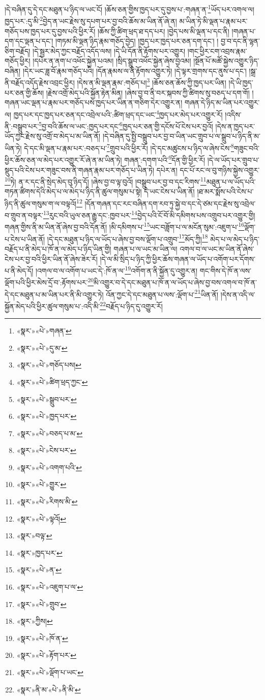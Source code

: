 །དེ་བཞིན་དུ་དེ་དང་མཐུན་པ་ཉིད་ལ་ཡང་ངོ། །ཆོས་ཅན་གྱིས་ཁྱད་པར་དུ་བྱས་པ་:གཞན་ན་\footnote{«སྣར་»«པེ་»གཞན་}ཡོད་པར་འགལ་ལ། ཁྱད་པར་:དུ་མི་\footnote{«སྣར་»«པེ་»དུ་མ་}བྱེད་ན་ཡང་རྗེས་སུ་དཔག་པར་བྱ་བའི་ཆོས་མ་ཡིན་ནོ་ཞེ་ན། མ་ཡིན་ཏེ་མི་ལྡན་པ་རྣམ་པར་གཅོད་པས་ཁྱད་པར་དུ་བྱས་པའི་ཕྱིར་རོ། །ཆོས་ཀྱི་ཚིག་ཕྲད་ཐ་དད་པར། །བྱེད་པས་མི་ལྡན་པ་དང་ནི། །གཞན་པ་དག་དང་ལྡན་པ་དང་། །གཏམ་མི་ལྡན་ཉིད་རྣམ་གཅོད་བྱེད། །ཁྱད་པར་ཁྱད་པར་ཅན་དག་དང་། །
བྱ་བ་དང་ནི་ལྷན་ཅིག་བརྗོད། །དེ་སྦྱར་མེད་ཀྱང་བརྗོད་འདོད་ལས། །དེ་ཡི་དོན་ནི་རྟོགས་པར་འགྱུར། །གང་ཕྱིར་ངག་འབྲས་རྣམ་གཅོད་ཕྱིར། །དཔེར་ན་ནག་པ་འཕོང་སྐྱེན་པའམ། །སྲིད་སྒྲུབ་འཕོང་སྐྱེན་ཞེས་བྱའམ། །སྔོན་པོ་མཚོ་སྐྱེས་འགྱུར་ཉིད་བཞིན། །དེར་ཡང་ཟླ་བོ་རྣམ་གཅོད་པའི། །དོན་རྣམས་ལ་ནི་རྟོགས་འགྱུར་ཏེ། །དེ་ལྟར་གྲགས་དང་ནུས་པ་དང་། །སྒྲ་ནི་བརྗོད་འདོད་རྗེས་འབྲང་ཕྱིར། །དེས་ན་མི་ལྡན་རྣམ་:གཅོད་པ།\footnote{«སྣར་»«པེ་»གཅོད་པས།} །ཆོས་ཅན་ཆོས་ཀྱི་ཁྱད་པར་ཡིན། །དེ་ཡི་ཁྱད་པར་ཅན་གྱི་ཆོས། །རྗེས་འགྲོ་མེད་པའི་སྐྱོན་རྟེན་མིན། །ཞེས་བྱ་བ་ནི་བར་སྐབས་ཀྱི་ཚིགས་སུ་བཅད་པ་དག་གོ། །གཞན་ཡང་ལྡན་པ་རྣམ་པར་གཅོད་པས་ཁྱད་པར་ཡིན་ན་གཅིག་དེར་འགྱུར་ན། གཞན་དེ་ཉིད་མ་ཡིན་པར་འགྱུར་ལ། ཁྱད་པར་དང་ཁྱད་པར་ཅན་དང་འབྲེལ་པའི་:ཚིག་ཕྲད་དང་ཡང་\footnote{«སྣར་»«པེ་»ཚིག་ཕྲད་ཀྱང་}ཁྱད་པར་མེད་པར་འགྱུར་རོ། །འདིས་ནི་:བསྒྲུབ་པར་\footnote{«སྣར་»«པེ་»སྒྲུབ་པར་}བྱ་བའི་ཆོས་ལ་ཡང་:ཁྱད་པར་དང་\footnote{«སྣར་»«པེ་»ཁྱད་པར་}ཁྱད་པར་ཅན་གྱི་དངོས་པོ་ངེས་པར་བྱའོ། །དེས་ན་ཁྱད་པར་ཡོད་ཀྱང་རྗེས་སུ་འགྲོ་བ་མེད་པ་མ་ཡིན་ནོ། །དེ་བཞིན་དུ་སྤྱི་བསྒྲུབ་པར་བྱ་བ་ཡིན་ཡང་གྲུབ་པ་ལ་སྒྲུབ་པ་ཉིད་ནི་མ་ཡིན་ཏེ། དེ་དང་མི་ལྡན་པ་རྣམ་པར་:བཅད་པ་\footnote{«སྣར་»«པེ་»བཅད་པ་མ་}གྲུབ་པའི་ཕྱིར་རོ། །དེ་དང་མཚུངས་པ་ཉིད་ལ་ཞེས་ངེས་\footnote{«སྣར་»«པེ་»ངེས་པར་}གཟུང་བའི་ཕྱིར་ཆོས་ཅན་ལ་མེད་པར་འགྱུར་རོ་ཞེ་ན་མ་ཡིན་ཏེ། གཞན་:དགག་པའི་\footnote{«སྣར་»«པེ་»འགག་པའི་}དོན་གྱི་ཕྱིར་རོ། །དེ་ལ་ཡོད་པར་གྲུབ་པ་སྡུད་པའི་ངེས་པར་གཟུང་བས་ནི་གཞན་རྣམ་པར་གཅོད་པ་ཡིན་ཏེ། དཔེར་ན། དང་པོ་རང་ལ་བུ་གཉིས་སྐྱེས་འགྱུར་\footnote{«སྣར་»«པེ་»གྱུར་}ཏེ། ན་ར་དང་ནི་སྲེད་མེད་བུ་ཉིད་དོ། །ཞེས་བྱ་བ་ལྟ་བུའོ། །བསྒྲུབ་པར་བྱ་བ་དང་རིགས་\footnote{«སྣར་»«པེ་»རིགས་མི་}མཐུན་པ་ལ་ཡོད་པའི་གཏན་ཚིགས་དེའི་མེད་པ་ལ་མེད་པ་ཉིད་ནི་ཚུལ་གསུམ་པ་སྟེ། དེ་ཡང་ངེས་པ་ཡིན་ནོ། །ཐ་མར་སྨོས་པའི་ངེས་པ་ཉིད་ནི་ཚུལ་གསུམ་ག་ལ་བལྟའོ།\footnote{«སྣར་»«པེ་»ལྟའོ།} །དོན་གཞན་དང་རང་བཞིན་དག་རབ་ཏུ་སྐྱེ་བ་དང་དེ་ཙམ་དང་རྗེས་སུ་འབྲེལ་བ་གྲུབ་ན་བལྟར་\footnote{«སྣར་»བལྟ་}རུང་བའི་ཡུལ་ཅན་རྒྱུ་དང་:ཁྱབ་པར་\footnote{«སྣར་»ཁྱད་པར་}བྱེད་པའི་ངོ་བོ་མི་དམིགས་པས་འགྲུབ་པར་འགྱུར་གྱི། གཞན་གྱིས་ནི་མ་ཡིན་ནོ་ཞེས་བྱ་བའི་དོན་ནོ། །མི་དམིགས་པ་\footnote{«སྣར་»«པེ་»ན་}ཡང་བཟློག་པ་ལ་མངོན་སུམ་:འཇུག་པ་\footnote{«སྣར་»«པེ་»འཇུག་པ་ལ་}ལྡོག་པ་ངེས་པ་ཡིན་ནོ། །དེ་དང་མཐུན་པ་ཉིད་ལ་ཡོད་པ་ཞེས་བྱ་བས་ལྡོག་པ་འགྲུབ་\footnote{«སྣར་»«པེ་»གྲུབ་}མོད་ཀྱི།\footnote{«སྣར་»ཀྱིས།} མེད་པ་ལ་མེད་པ་ཉིད་བརྗོད་པ་ནི་མེད་པ་ཁོ་ན་ལ་མེད་པ་ཉིད་ཡིན་གྱི། གཞན་པ་ལ་ཡང་མ་ཡིན་ལ། འགལ་བ་ལ་ཡང་མ་ཡིན་ནོ་ཞེས་ངེས་པར་བྱ་བའི་ཕྱིར་ཡིན་ནོ་ཞེས་ཟེར་རོ། །དེ་ལ་མི་སྲིད་པ་ཉིད་ཀྱི་ཕྱིར་ཆོས་གཞན་ལ་ཡོད་པ་འགོག་པར་དོགས་པ་ནི་མེད་དོ། །འགལ་བ་ལ་འགོག་པ་ཡང་དེ་:ཁོ་ན་ལ་\footnote{«སྣར་»«པེ་»ཁོ་ན་}འགོག་ན་ནི་སྐྱོན་དུ་འགྱུར་ན། གང་གིས་དེ་ཁོ་ན་ལས་ལྡོག་པའི་ཕྱིར་མེས་དྲོ་བ་:རྟོགས་པར་\footnote{«སྣར་»«པེ་»རྟོག་པར་}མི་འགྱུར་བ་དེ་དང་མཐུན་པ་ཁོ་ན་ལ་ཡོད་པ་ཞེས་བྱ་བས་འགལ་བ་ཁོ་ན་དེ་དང་མཐུན་པ་མ་ཡིན་པར་ནི་མི་འགྱུར་ཏེ། འོན་ཀྱང་དེ་དང་མཐུན་པ་ལས་:ལྡོག་པ་\footnote{«སྣར་»«པེ་»ལྡོག་པ་ཡང་}ཡིན་ནོ། །དེས་ན་འདི་ལ་སྐྱོན་མེད་པའི་ཕྱིར་ཚུལ་གསུམ་པ་:འདི་མི་\footnote{«སྣར་»ནི་མ་«པེ་»ནི་མི་}བརྗོད་པ་ཉིད་དུ་འགྱུར་རོ། 